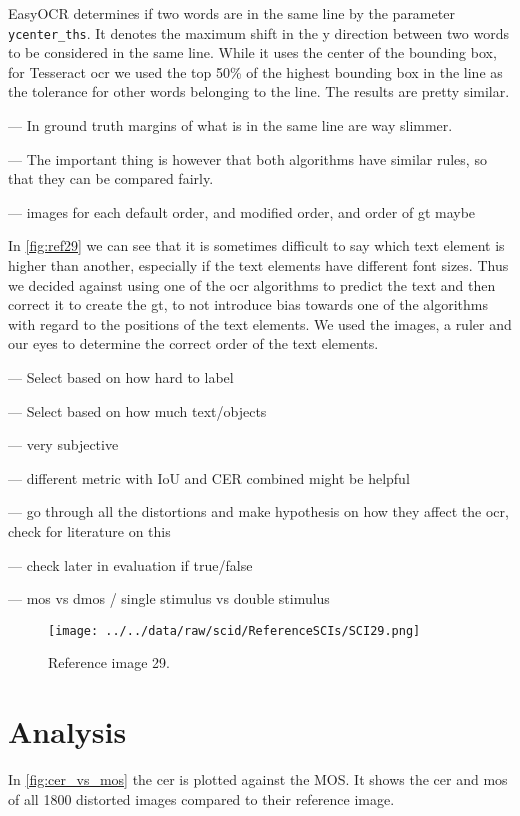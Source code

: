 EasyOCR determines if two words are in the same line by the parameter \texttt{ycenter\_ths}.
It denotes the maximum shift in the y direction between two words to be considered in the same line.
While it uses the center of the bounding box, for Tesseract \gls{ocr} we used the top 50\% of the highest bounding box in the line as the tolerance for other words belonging to the line.
The results are pretty similar.

--- In ground truth margins of what is in the same line are way slimmer.

--- The important thing is however that both algorithms have similar rules, so that they can be compared fairly.

--- images for each default order, and modified order, and order of gt maybe


In \autoref{fig:ref29} we can see that it is sometimes difficult to say which text element is higher than another, especially if the text elements have different font sizes.
Thus we decided against using one of the \gls{ocr} algorithms to predict the text and then correct it to create the \gls{gt}, to not introduce bias towards one of the algorithms with regard to the positions of the text elements.
We used the images, a ruler and our eyes to determine the correct order of the text elements.

--- Select based on how hard to label

--- Select based on how much text/objects

--- very subjective

--- different metric with IoU and CER combined might be helpful

--- go through all the distortions and make hypothesis on how they affect the ocr, check for literature on this

--- check later in evaluation if true/false

--- mos vs dmos / single stimulus vs double stimulus

\begin{figure}
    \centering
    \texttt{[image: ../../data/raw/scid/ReferenceSCIs/SCI29.png]}
    \caption{Reference image 29.}
    \label{fig:ref29}
\end{figure}

\section{Analysis}
\label{sec:dataset_analysis}

In \autoref{fig:cer_vs_mos} the cer is plotted against the MOS.
It shows the \gls{cer} and \gls{mos} of all 1800 distorted images compared to their reference image.

